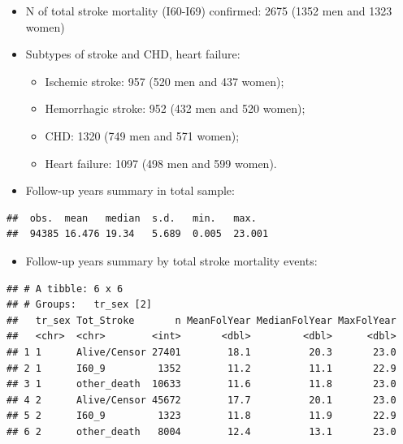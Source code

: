 \documentclass[]{tufte-handout}
\providecommand{\tightlist}{%
  \setlength{\itemsep}{0pt}\setlength{\parskip}{0pt}}
\begin{document}
\begin{itemize}
\tightlist
\item
  N of total stroke mortality (I60-I69) confirmed: 2675 (1352 men and
  1323 women) \newpage
\item
  Subtypes of stroke and CHD, heart failure:

  \begin{itemize}
  \tightlist
  \item
    Ischemic stroke: 957 (520 men and 437 women);
  \item
    Hemorrhagic stroke: 952 (432 men and 520 women);
  \item
    CHD: 1320 (749 men and 571 women);
  \item
    Heart failure: 1097 (498 men and 599 women).
  \end{itemize}
\item
  Follow-up years summary in total sample:
\end{itemize}

\begin{verbatim}
##  obs.  mean   median  s.d.   min.   max.  
##  94385 16.476 19.34   5.689  0.005  23.001
\end{verbatim}

\begin{itemize}
\tightlist
\item
  Follow-up years summary by total stroke mortality events:
\end{itemize}

\begin{verbatim}
## # A tibble: 6 x 6
## # Groups:   tr_sex [2]
##   tr_sex Tot_Stroke       n MeanFolYear MedianFolYear MaxFolYear
##   <chr>  <chr>        <int>       <dbl>         <dbl>      <dbl>
## 1 1      Alive/Censor 27401        18.1          20.3       23.0
## 2 1      I60_9         1352        11.2          11.1       22.9
## 3 1      other_death  10633        11.6          11.8       23.0
## 4 2      Alive/Censor 45672        17.7          20.1       23.0
## 5 2      I60_9         1323        11.8          11.9       22.9
## 6 2      other_death   8004        12.4          13.1       23.0
\end{verbatim}
\end{document}
